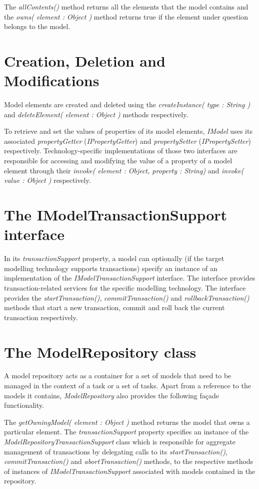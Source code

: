 The \emph{allContents()} method returns all the elements that the model contains and the \emph{owns( element : Object )} method returns true if the element under question belongs to the model.

\section{Creation, Deletion and Modifications}
\label{sec:Design.EMC.CRUD}

Model elements are created and deleted using the \emph{createInstance( type : String )} and \emph{deleteElement( element : Object )} methods respectively.

To retrieve and set the values of properties of its model elements, \emph{IModel} uses its associated \emph{propertyGetter} (\emph{IPropertyGetter}) and \emph{propertySetter} (\emph{IPropertySetter}) respectively. Technology-specific implementations of those two interfaces are responsible for accessing and modifying the value of a property of a model element through their \emph{invoke( element : Object, property : String)} and \emph{invoke( value : Object )} respectively.

\section{The IModelTransactionSupport interface}
\label{sec:EMC.ModelTransactionSupport}
In its \emph{transactionSupport} property, a model can optionally (if the target modelling technology supports transactions) specify an instance of an implementation of the \emph{IModelTransactionSupport} interface. The interface provides transaction-related services for the specific modelling technology. The interface provides the \emph{startTransaction()}, \emph{commitTransaction()} and \emph{rollbackTransaction()} methods that start a new transaction, commit and roll back the current transaction respectively.

\section{The ModelRepository class}

A model repository acts as a container for a set of models that need to be managed in the context of a task or a set of tasks. Apart from a reference to the models it contains, \emph{ModelRepository} also provides the following fa\c{c}ade functionality.

The \emph{getOwningModel( element : Object )} method returns the model that owns a particular element. The \emph{transactionSupport} property specifies an instance of the \emph{ModelRepositoryTransactionSupport} class which is responsible for aggregate management of transactions by delegating calls to its \emph{startTransaction()}, \emph{commitTransaction()} and \emph{abortTransaction()} methods, to the respective methods of instances of \emph{IModelTransactionSupport} associated with models contained in the repository.

